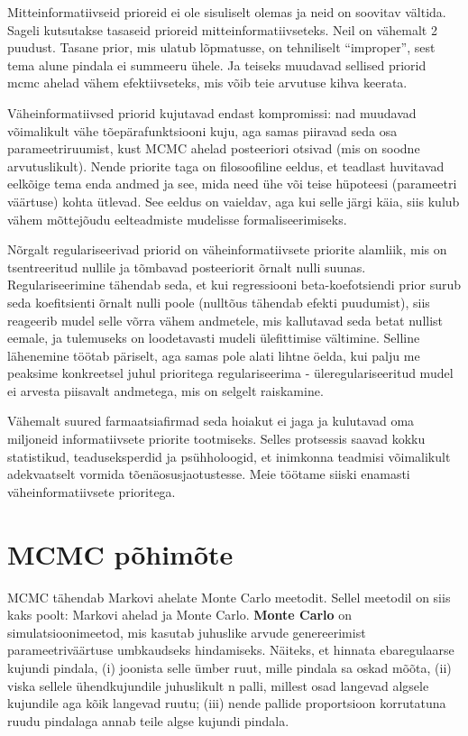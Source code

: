 \documentclass[]{book}
\begin{document}
Mitteinformatiivseid prioreid ei ole sisuliselt olemas ja neid on
soovitav vältida. Sageli kutsutakse tasaseid prioreid
mitteinformatiivseteks. Neil on vähemalt 2 puudust. Tasane prior, mis
ulatub lõpmatusse, on tehniliselt ``improper'', sest tema alune pindala
ei summeeru ühele. Ja teiseks muudavad sellised priorid mcmc ahelad
vähem efektiivseteks, mis võib teie arvutuse kihva keerata.

Väheinformatiivsed priorid kujutavad endast kompromissi: nad muudavad
võimalikult vähe tõepärafunktsiooni kuju, aga samas piiravad seda osa
parameetriruumist, kust MCMC ahelad posteeriori otsivad (mis on soodne
arvutuslikult). Nende priorite taga on filosoofiline eeldus, et teadlast
huvitavad eelkõige tema enda andmed ja see, mida need ühe või teise
hüpoteesi (parameetri väärtuse) kohta ütlevad. See eeldus on vaieldav,
aga kui selle järgi käia, siis kulub vähem mõttejõudu eelteadmiste
mudelisse formaliseerimiseks.

Nõrgalt regulariseerivad priorid on väheinformatiivsete priorite
alamliik, mis on tsentreeritud nullile ja tõmbavad posteeriorit õrnalt
nulli suunas. Regulariseerimine tähendab seda, et kui regressiooni
beta-koefotsiendi prior surub seda koefitsienti õrnalt nulli poole
(nulltõus tähendab efekti puudumist), siis reageerib mudel selle võrra
vähem andmetele, mis kallutavad seda betat nullist eemale, ja tulemuseks
on loodetavasti mudeli ülefittimise vältimine. Selline lähenemine töötab
päriselt, aga samas pole alati lihtne öelda, kui palju me peaksime
konkreetsel juhul prioritega regulariseerima - üleregulariseeritud mudel
ei arvesta piisavalt andmetega, mis on selgelt raiskamine.

Vähemalt suured farmaatsiafirmad seda hoiakut ei jaga ja kulutavad oma
miljoneid informatiivsete priorite tootmiseks. Selles protsessis saavad
kokku statistikud, teaduseksperdid ja psühholoogid, et inimkonna
teadmisi võimalikult adekvaatselt vormida tõenäosusjaotustesse. Meie
töötame siiski enamasti väheinformatiivsete prioritega.

\chapter{MCMC põhimõte}\label{mcmc-pohimote}

MCMC tähendab Markovi ahelate Monte Carlo meetodit. Sellel meetodil on
siis kaks poolt: Markovi ahelad ja Monte Carlo. \textbf{Monte Carlo} on
simulatsioonimeetod, mis kasutab juhuslike arvude genereerimist
parameetriväärtuse umbkaudseks hindamiseks. Näiteks, et hinnata
ebaregulaarse kujundi pindala, (i) joonista selle ümber ruut, mille
pindala sa oskad mõõta, (ii) viska sellele ühendkujundile juhuslikult n
palli, millest osad langevad algsele kujundile aga kõik langevad ruutu;
(iii) nende pallide proportsioon korrutatuna ruudu pindalaga annab teile
algse kujundi pindala.
\end{document}
